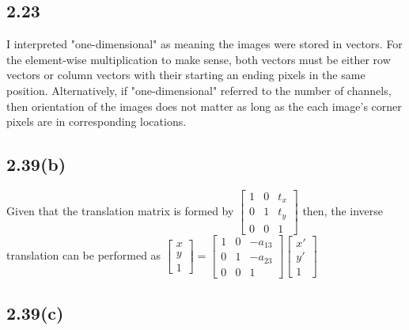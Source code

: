 \documentclass{article}[12 pt]
\begin{document}
\subsection*{2.23}

I interpreted "one-dimensional" as meaning the images were stored in vectors.  For the element-wise multiplication to make sense, both vectors must be either row vectors or column vectors with their starting an ending pixels in the same position.  Alternatively, if "one-dimensional" referred to the number of channels, then orientation of the images does not matter as long as the each image's corner pixels are in corresponding locations.

\subsection*{2.39(b)}

Given that the translation matrix is formed by $\begin{bmatrix} 1 & 0 & t_x \\ 0 & 1 & t_y \\ 0 & 0 & 1 \end{bmatrix}$
then, the inverse translation can be performed as 
$\left[ \begin{array}{c} x \\ y \\ 1 \end{array} \right] = \begin{bmatrix} 1 & 0 & -a_{13} \\ 0 & 1 & -a_{23} \\ 0 & 0 & 1 \end{bmatrix} \left[ \begin{array}{c} x' \\ y' \\ 1 \end{array} \right]$


\subsection*{2.39(c)}
\end{document}
